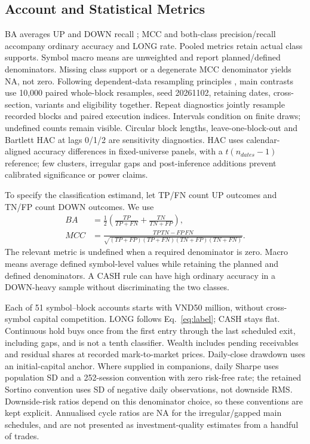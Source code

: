 \subsection{Account and Statistical Metrics}
BA averages UP and DOWN recall \cite{brodersen2010balanced}; MCC \cite{chicco2020mcc} and both-class precision/recall accompany ordinary accuracy and LONG rate. Pooled metrics retain actual class supports. Symbol macro means are unweighted and report planned/defined denominators. Missing class support or a degenerate MCC denominator yields NA, not zero. Following dependent-data resampling principles \cite{lahiri2003resampling}, main contrasts use 10,000 paired whole-block resamples, seed 20261102, retaining dates, cross-section, variants and eligibility together. Repeat diagnostics jointly resample recorded blocks and paired execution indices. Intervals condition on finite draws; undefined counts remain visible. Circular block lengths, leave-one-block-out and Bartlett HAC \cite{newey1987hac} at lags 0/1/2 are sensitivity diagnostics. HAC uses calendar-aligned accuracy differences in fixed-universe panels, with a $t(n_{dates}-1)$ reference; few clusters, irregular gaps and post-inference additions prevent calibrated significance or power claims.

To specify the classification estimand, let TP/FN count UP outcomes and TN/FP count DOWN outcomes. We use
\begin{equation}
 \begin{aligned}
 BA&=\frac12\left(\frac{TP}{TP+FN}+\frac{TN}{TN+FP}\right),\\
 MCC&=\frac{TP\,TN-FP\,FN}{\sqrt{(TP+FP)(TP+FN)(TN+FP)(TN+FN)}}.
 \end{aligned}
 \label{eq:classification_metrics}
\end{equation}
The relevant metric is undefined when a required denominator is zero. Macro means average defined symbol-level values while retaining the planned and defined denominators. A CASH rule can have high ordinary accuracy in a DOWN-heavy sample without discriminating the two classes.

Each of 51 symbol--block accounts starts with VND50 million, without cross-symbol capital competition. LONG follows Eq.~\ref{eq:label}; CASH stays flat. Continuous hold buys once from the first entry through the last scheduled exit, including gaps, and is not a tenth classifier. Wealth includes pending receivables and residual shares at recorded mark-to-market prices. Daily-close drawdown uses an initial-capital anchor. Where supplied in companions, daily Sharpe uses population SD and a 252-session convention with zero risk-free rate; the retained Sortino convention uses SD of negative daily observations, not downside RMS. Downside-risk ratios \cite{sortino1994downside} depend on this denominator choice, so these conventions are kept explicit. Annualised cycle ratios are NA for the irregular/gapped main schedules, and are not presented as investment-quality estimates from a handful of trades.

